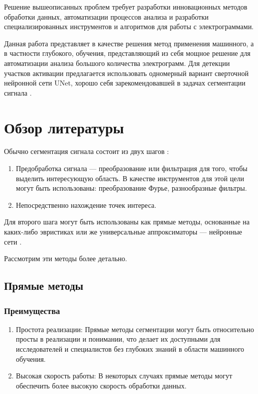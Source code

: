 Решение вышеописанных проблем требует разработки инновационных методов обработки данных,
автоматизации процессов анализа и разработки специализированных инструментов и
алгоритмов для работы с электрограммами.

Данная работа представляет в качестве решения метод применения машинного, а в
частности глубокого, обучения, представляющий из себя мощное решение для
автоматизации анализа большого количества электрограмм. Для детекции участков
активации предлагается использовать одномерный вариант сверточной нейронной
сети UNet, хорошо себя зарекомендовавшей в задачах сегментации сигнала \cite{victor}.

\section{Обзор литературы}
Обычно сегментация сигнала состоит из двух шагов \cite{ecg-segmentation}:

\begin{enumerate}
	\item Предобработка сигнала --- преобразование или фильтрация для того,
	чтобы выделить интересующую область. В качестве инструментов для этой цели
	могут быть использованы: преобразование Фурье, разнообразные фильтры.

	\item Непосредственно нахождение точек интереса.

\end{enumerate}

Для второго шага могут быть использованы как прямые методы, основанные на
каких-либо эвристиках \cite{euristic-1, euristic-2, euristic-3, euristic-4,
	euristic-5} или же универсальные аппроксиматоры --- нейронные сети
\cite{victor}.

Рассмотрим эти методы более детально.

\subsection{Прямые методы}
\subsubsection{Преимущества}

\begin{enumerate}
	\item Простота реализации: Прямые методы сегментации могут быть
	относительно просты в реализации и понимании, что делает их доступными
	для исследователей и специалистов без глубоких знаний в области
	машинного обучения.

	\item Высокая скорость работы: В некоторых случаях прямые методы могут
	обеспечить более высокую скорость обработки данных.
\end{enumerate}

